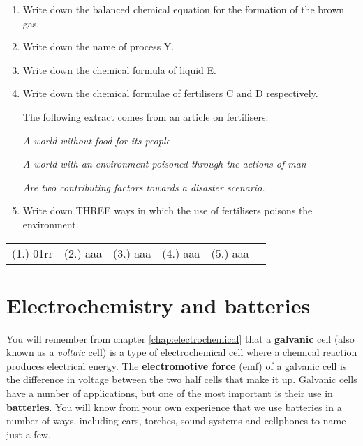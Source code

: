 {\begin{enumerate}
\item{Write down the balanced chemical equation for the formation of the brown gas.}
\item{Write down the name of process Y.}
\item{Write down the chemical formula of liquid E.}
\item{Write down the chemical formulae of fertilisers C and D respectively.}

The following extract comes from an article on fertilisers:
\begin{center}
\textit{A world without food for its people}

\textit{A world with an environment poisoned through the actions of man }

\textit{Are two contributing factors towards a disaster scenario.}

\end{center}

\item{Write down THREE ways in which the use of fertilisers poisons the environment.}
\end{enumerate}

\par \practiceinfo
\par \begin{tabular}[h]{cccccc}
(1.)	01rr	&
(2.)	aaa	&
(3.)	aaa	&
(4.)	aaa	&
(5.)	aaa	&
\end{tabular}

}

\section{Electrochemistry and batteries}
\label{sec:chemindustry:batteries}

You will remember from chapter \ref{chap:electrochemical} that a \textbf{galvanic} cell (also known as a \textit{voltaic} cell) is a type of electrochemical cell where a chemical reaction produces electrical energy. The \textbf{electromotive force} (emf) of a galvanic cell is the difference in voltage between the two half cells that make it up. Galvanic cells have a number of applications, but one of the most important is their use in \textbf{batteries}. You will know from your own experience that we use batteries in a number of ways, including cars, torches, sound systems and cellphones to name just a few.

